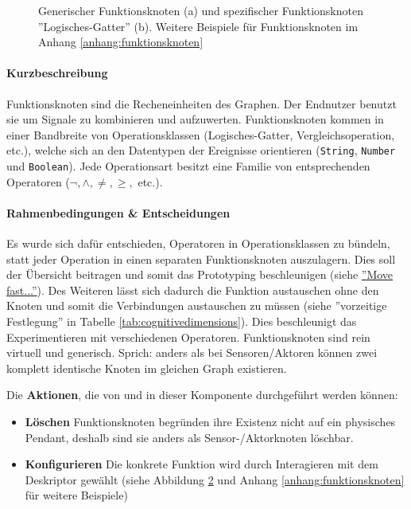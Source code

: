 \begin{figure}[h]
\begin{subfigure}{.5\textwidth}
  \caption{}
  \label{fig:functionnodesgate}
\end{subfigure}
    \caption{Generischer Funktionsknoten (a) und spezifischer Funktionsknoten ''Logisches-Gatter'' (b). Weitere Beispiele für Funktionsknoten im Anhang \ref{anhang:funktionsknoten}}
    \label{fig:functionnodes}
\end{figure}

\paragraph{Kurzbeschreibung} Funktionsknoten sind die Recheneinheiten des Graphen. Der Endnutzer benutzt sie um Signale zu kombinieren und aufzuwerten. Funktionsknoten kommen in einer Bandbreite von Operationsklassen (Logisches-Gatter, Vergleichsoperation, etc.), welche sich an den Datentypen der Ereignisse orientieren (\texttt{String}, \texttt{Number} und \texttt{Boolean}). Jede Operationsart besitzt eine Familie von entsprechenden Operatoren ($\neg, \land,\neq,\geq,$ etc.).

\paragraph{Rahmenbedingungen \& Entscheidungen} Es wurde sich dafür entschieden, Operatoren in Operationsklassen zu bündeln, statt jeder Operation in einen separaten Funktionsknoten auszulagern. Dies soll der Übersicht beitragen und somit das Prototyping beschleunigen (siehe \hyperref[par:movefast]{''Move fast...''}). Des Weiteren lässt sich dadurch die Funktion austauschen ohne den Knoten und somit die Verbindungen austauschen zu müssen (siehe ''vorzeitige Festlegung'' in Tabelle \ref{tab:cognitivedimensions}). Dies beschleunigt das Experimentieren mit verschiedenen Operatoren. Funktionsknoten sind rein virtuell und generisch. Sprich: anders als bei Sensoren/Aktoren können zwei komplett identische Knoten im gleichen Graph existieren.

Die \textbf{Aktionen}, die von und in dieser Komponente durchgeführt werden können: 
\begin{itemize}
    \item \textbf{Löschen} Funktionsknoten begründen ihre Existenz nicht auf ein physisches Pendant, deshalb sind sie anders als Sensor-/Aktorknoten löschbar.
    \item \textbf{Konfigurieren} Die konkrete Funktion wird durch Interagieren mit dem Deskriptor gewählt (siehe Abbildung \ref{fig:functionnodes} und Anhang \ref{anhang:funktionsknoten} für weitere Beispiele)
\end{itemize}

